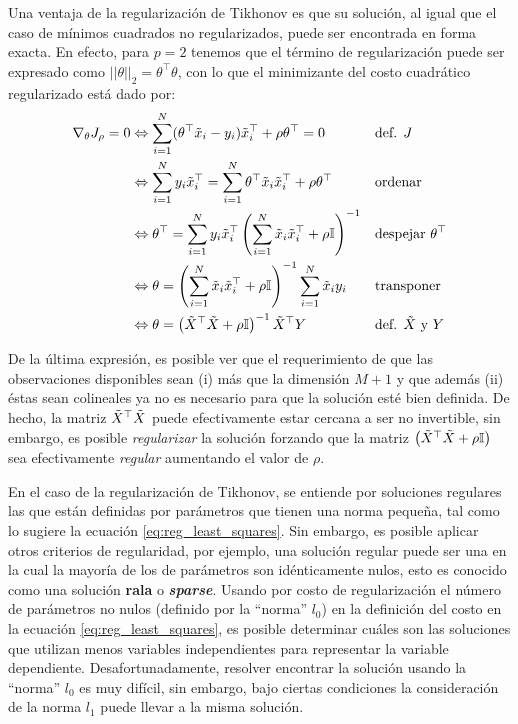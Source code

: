 Una ventaja de la regularización de Tikhonov es que su solución, al igual que el caso de mínimos cuadrados no regularizados, puede ser encontrada en forma exacta. En efecto, para $p=2$ tenemos que el término de regularización puede ser expresado como $||\theta||_2 = \theta^\top\theta$, con lo que el minimizante del costo cuadrático regularizado está dado por: 
\begin{align}
\nabla_\theta J_\rho=0 &\Leftrightarrow \sum_{i=1}^N(\theta^\top \tilde{x}_i - y_i)\tilde{x}_i^\top + \rho\theta^\top=0  							&&\text{def. $J$}\nonumber\\  
&\Leftrightarrow \sum_{i=1}^Ny_i\tilde{x}_i^\top = \sum_{i=1}^N\theta^\top \tilde{x}_i\tilde{x}_i^\top + \rho\theta^\top					&&\text{ordenar}\nonumber\\
&\Leftrightarrow \theta^\top = \sum_{i=1}^Ny_i\tilde{x}_i^\top \left(\sum_{i=1}^N \tilde{x}_i\tilde{x}_i^\top + \rho {\mathbb I}\right)^{-1}	&&\text{despejar $\theta^\top$}\nonumber\\
&\Leftrightarrow \theta =  \left(\sum_{i=1}^N \tilde{x}_i\tilde{x}_i^\top +\rho {\mathbb I}\right)^{-1} \sum_{i=1}^N \tilde{x}_i y_i 		&&\text{transponer}\nonumber\\
&\Leftrightarrow \theta = \left(\tilde{X}^\top\tilde{X} +\rho {\mathbb I}\right)^{-1} \tilde{X}^\top Y 											&&\text{def. $\tilde{X}$ y $Y$} \label{eq:least_sq_soln}
\end{align}

De la última expresión, es posible ver que el requerimiento de que las observaciones disponibles sean (i) más que la dimensión $M+1$ y que además (ii) éstas sean colineales ya no es necesario para que la solución esté bien definida. De hecho, la matriz $\tilde{X}^\top\tilde{X}$ puede efectivamente estar cercana a ser no invertible, sin embargo, es posible \emph{regularizar} la solución forzando que la matriz $\left(\tilde{X}^\top\tilde{X} +\rho {\mathbb I}\right)$ sea efectivamente \emph{regular} aumentando el valor de $\rho$. 

En el caso de la regularización de Tikhonov, se entiende por soluciones regulares las que están definidas por parámetros que tienen una norma pequeña, tal como lo sugiere la ecuación \eqref{eq:reg_least_squares}. Sin embargo, es posible aplicar otros criterios de regularidad, por ejemplo, una solución regular puede ser una en la cual la mayoría de los de parámetros son idénticamente nulos, esto es conocido como una solución \textbf{rala} o \textbf{\emph{sparse}}. Usando por costo de regularización el número de parámetros no nulos (definido por la ``norma'' $l_0$) en la definición del costo en la ecuación \eqref{eq:reg_least_squares}, es posible determinar cuáles son las soluciones que utilizan menos variables independientes para representar la variable dependiente. Desafortunadamente, resolver encontrar la solución usando la ``norma'' $l_0$ es muy difícil, sin embargo, bajo ciertas condiciones la consideración de la norma $l_1$ puede llevar a la misma solución.

